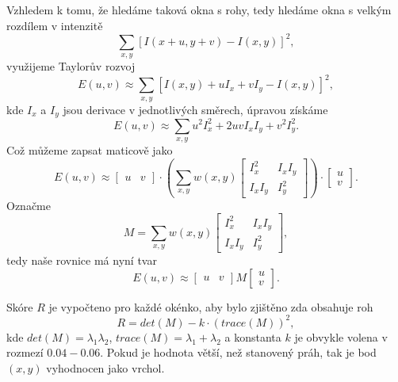 \documentclass[12pt, a4paper]{article}
\begin{document}
\par{Vzhledem k tomu, že hledáme taková okna s rohy, tedy hledáme okna s velkým rozdílem v intenzitě
\begin{equation}
	\sum_{x,y} \left[ I(x + u, y + v) - I(x, y)\right]^2,
\end{equation}
využijeme Taylorův rozvoj
\begin{equation}
	E(u, v) \approx \sum_{x,y}\left[I(x,y) + u I_x + v I_y - I(x,y)\right]^2,
\end{equation}
kde $I_x$ a $I_y$ jsou derivace v jednotlivých směrech, úpravou získáme
\begin{equation}
	E(u, v) \approx \sum_{x,y} u^2 I^2_x + 2uvI_x I_y + v^2 I_y^2.
\end{equation}
Což můžeme zapsat maticově jako
\begin{equation}
	E(u, v) \approx \left[ \begin{array}{cc} u & v
					\end{array} \right] \cdot \left( \sum_{x,y} w(x,y) 
					\left[ \begin{array}{cc}
					I_x^2 & I_x I_y\\
					I_x I_y & I_y^2 
					\end{array} \right] \right) \cdot
					\left[ \begin{array}{c}
					u\\
					v
					\end{array} \right].
\end{equation}
Označme
\begin{equation}
	M = \sum_{x,y} w(x,y) \left[ \begin{array}{cc}
									I_x^2 & I_x I_y\\
									I_x I_y & I_y^2 
								\end{array} \right],
\end{equation}
tedy naše rovnice má nyní tvar
\begin{equation}
	E (u, v) \approx \left[ \begin{array}{cc} u & v 	\end{array} \right] M \left[ \begin{array}{c} u \\ v	\end{array} \right].
\end{equation}}

\par{Skóre $R$ je vypočteno pro každé okénko, aby bylo zjištěno zda obsahuje roh
\begin{equation}
	R = det(M) - k \cdot (trace(M))^2,
\end{equation}
kde $det(M) = \lambda_1 \lambda_2$, $trace(M) = \lambda_1 + \lambda_2$ a konstanta $k$ je obvykle volena v rozmezí $0.04-0.06$. Pokud je hodnota větší, než stanovený práh, tak je bod $(x, y)$ vyhodnocen jako vrchol.}
\end{document}
